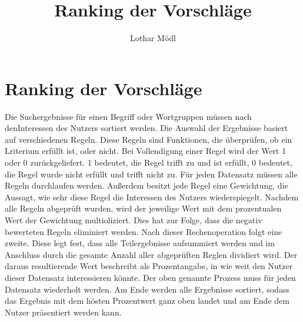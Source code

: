 \documentclass[a4paper,12pt]{article}
\title{Ranking der Vorschläge}
\author{Lothar Mödl}
\begin{document}
\section{Ranking der Vorschläge}

Die Suchergebnisse für einen Begriff oder Wortgruppen müssen nach denInteressen des Nutzers sortiert werden. Die Auswahl der Ergebnisse basiert auf verschiedenen Regeln. Diese Regeln sind Funktionen, die überprüfen, ob ein Lriterium erfüllt ist, oder nicht. Bei Vollendigung einer Regel wird der Wert 1 oder 0 zurückgeliefert. 1 bedeutet, die Regel trifft zu und ist erfüllt, 0 bedeutet, die Regel wurde nicht erfüllt und trifft nicht zu. Für jeden Datensatz müssen alle Regeln durchlaufen werden. Außerdem besitzt jede Regel eine Gewichtung, die Aussagt, wie sehr diese Regel die Interessen des Nutzers wiederspiegelt. Nachdem alle Regeln abgeprüft wurden, wird der jeweilige Wert mit dem prozentualen Wert der Gewichtung multioliziert. Dies hat zur Folge, dass die negativ bewerteten Regeln eliminiert werden. Nach dieser Rechenoperation folgt eine zweite. Diese legt fest, dass alle Teilergebnisse aufsummiert werden und im Anschluss durch die gesamte Anzahl aller abgeprüften Reglen dividiert wird. Der daraus resultierende Wert beschreibt als Prozentangabe, in wie weit den Nutzer dieser Datensatz interessieren könnte. Der oben genannte Prozess muss für jeden Datensatz wiederholt werden. Am Ende werden alle Ergebnisse sortiert, sodass das Ergebnis mit dem hösten Prozentwert ganz oben landet und am Ende dem Nutzer präsentiert werden kann. 
\end{document}
